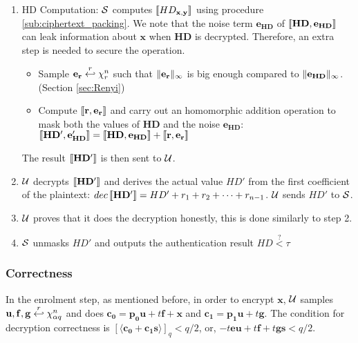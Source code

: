 \begin{description}
\begin{enumerate}
  \item HD Computation: $\mathcal{S}$ computes $\left\llbracket HD_{\mathbf{x,y}}\right\rrbracket$
    using procedure \ref{sub:ciphertext_packing}. We note that the noise term $\mathbf{e_{HD}}$ of
    $\left\llbracket\mathbf{HD,e_{HD}}\right\rrbracket$ can leak information
    about $\mathbf{x}$ when $\mathbf{HD}$ is decrypted. Therefore,
    an extra step is needed to secure the operation.
    \begin{itemize}
    \item Sample $\mathbf{e_{r}} \stackrel{r}{\hookleftarrow} \chi_{r}^n$ such that $\Vert \mathbf{e_r} \Vert_{\infty}$ is big enough compared to
      $\Vert \mathbf{e_{HD}} \Vert_{\infty}$.(Section \ref{sec:Renyi})
    \item Compute $\left\llbracket\mathbf{r,e_r}\right\rrbracket$ and carry out an homomorphic addition operation to mask both the values of
      $\mathbf{HD}$ and the noise $\mathbf{e_{HD}}$:
      $\left\llbracket\mathbf{HD', e'_{HD}}\right\rrbracket = \left\llbracket\mathbf{HD, e_{HD}}\right\rrbracket + \left\llbracket\mathbf{r,e_r}\right\rrbracket$
    \end{itemize}
    The result $\left\llbracket\mathbf{HD'}\right\rrbracket$ is then sent to $\mathcal{U}$.
  \item \(\mathcal{U}\) decrypts $\left\llbracket\mathbf{HD'}\right\rrbracket$ and derives the actual value ${HD'}$ from the first coefficient of the
    plaintext: \( dec\left\llbracket\mathbf{HD'}\right\rrbracket = HD' + r_1 + r_2 + \dots + r_{n-1} \). \(\mathcal{U}\) sends \(HD'\) to \(\mathcal{S}\).
  \item \(\mathcal{U}\) proves that it does the decryption honestly, this is done similarly to step 2.
  \item \(\mathcal{S}\) unmasks \(HD'\) and outputs the authentication result \(HD \stackrel{?}{<} \tau\)
  \end{enumerate}

\end{description}

\subsubsection{Correctness}
\label{sec:correctness}
In the enrolment step, as mentioned before, in order to encrypt $\mathbf{x}$, $\mathcal{U}$ samples
$\mathbf{u,f,g} \stackrel{r}{\hookleftarrow} \chi_{\alpha q}^n$ and does $\mathbf{c_0} = \mathbf{p_0u} + t\mathbf{f} + \mathbf{x}$ and
$\mathbf{c_1} = \mathbf{p_1u} + t\mathbf{g}$. The condition for decryption correctness is
$[\langle \mathbf{c_0 + c_1s} \rangle]_q < q/2$, or, $-t\mathbf{eu} + t\mathbf{f} + t\mathbf{gs} < q/2$.

